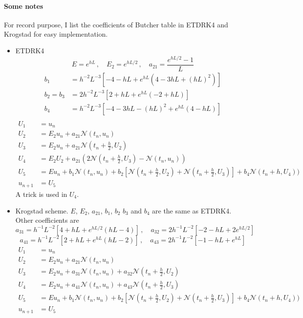 \paragraph{Some notes}
For record purpose, I list the coefficients of Butcher table in
ETDRK4 and Krogstad for easy implementation.
\begin{itemize}
\item ETDRK4
  \[
    E = e^{hL}\,,\quad 
    E_2 = e^{hL/2}\,,\quad
    a_{21} = \frac{e^{hL/2}-1}{L}
  \]
  \begin{align*}
    b_1 & = h^{-2}L^{-3}[-4-hL+e^{hL}(4-3hL+(hL)^2)] \\
    b_2 = b_3 & = 2h^{-2}L^{-3}[2+hL+e^{hL}(-2+hL)] \\
    b_4 & = h^{-2}L^{-3}[-4-3hL-(hL)^2+e^{hL}(4-hL)] \\
  \end{align*}
  \begin{align*}
    U_1 & = u_n \\
    U_2 & = E_2 u_n + a_{21} \mathcal{N}(t_n, u_n) \\
    U_3 & = E_2 u_n + a_{21} \mathcal{N}(t_n+\frac{h}{2}, U_2) \\
    U_4 & = E_2 U_2 + a_{21} (2\mathcal{N}(t_n+\frac{h}{2}, U_3)-
          \mathcal{N}(t_n, u_n) )\\
    U_5 & = E u_n + b_{1} \mathcal{N}(t_n, u_n)
          +b_2[\mathcal{N}(t_n+\frac{h}{2}, U_2) + 
          \mathcal{N}(t_n+\frac{h}{2}, U_3)]
          +b_4 \mathcal{N}(t_n+h, U_4) )\\
    u_{n+1} & = U_5
  \end{align*}
  A trick is used in $U_4$.

\item Krogstad scheme.
  $E$, $E_2$, $a_{21}$, $b_1$, $b_2$ $b_3$ and $b_4$ are the same as 
  ETDRK4.
  Other coefficients are 
  \[
    a_{31} =  h^{-1}L^{-2}[4+hL+e^{hL/2}(hL-4)]\,,\quad 
    a_{32} =  2h^{-1}L^{-2}[-2-hL+2e^{hL/2}]
  \]
  \[
    a_{41} =  h^{-1}L^{-2}[2+hL+e^{hL}(hL-2)]\,,\quad 
    a_{43} =  2h^{-1}L^{-2}[-1-hL+e^{hL}]
  \]
  \begin{align*}
    U_1 & = u_n \\
    U_2 & = E_2 u_n + a_{21} \mathcal{N}(t_n, u_n) \\
    U_3 & = E_2 u_n + a_{31} \mathcal{N}(t_n, u_n) +
          a_{32} \mathcal{N}(t_n+\frac{h}{2}, U_2) \\
    U_4 & = E_2 u_n + a_{41}\mathcal{N}(t_n, u_n) 
          + a_{43}\mathcal{N}(t_n+\frac{h}{2}, U_3) \\
    U_5 & = E u_n + b_{1} \mathcal{N}(t_n, u_n)
          +b_2[\mathcal{N}(t_n+\frac{h}{2}, U_2) + 
          \mathcal{N}(t_n+\frac{h}{2}, U_3)]
          +b_4 \mathcal{N}(t_n+h, U_4) )\\
    u_{n+1} & = U_5
  \end{align*}
\end{itemize}

